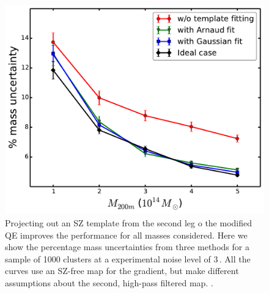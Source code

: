  \begin{figure}[htb]
\includegraphics[width=\linewidth]{figs/uncen_vs_mass.pdf}
 \caption{
 Projecting out an SZ template from the second leg o the modified QE improves the performance for all masses considered. 
 Here we show the percentage mass uncertainties from three methods for a sample of 1000 clusters at a experimental noise level of 3\,\ukarcmin{}.
 All the curves use an SZ-free map for the gradient, but make different assumptions about the second, high-pass filtered map. 
 .
 }
\label{fig:template_fitting}
\end{figure}
